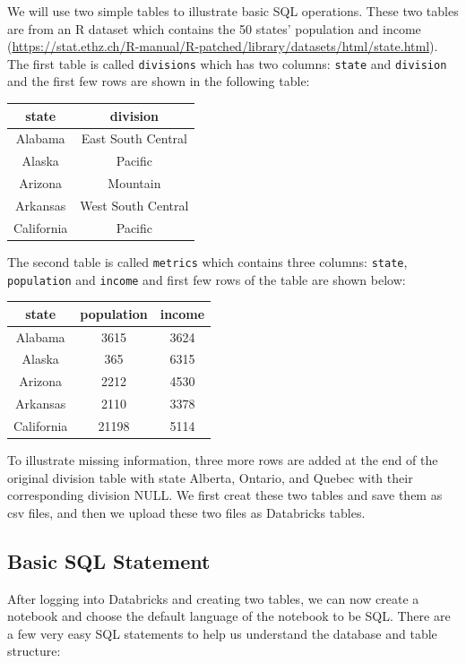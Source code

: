 \documentclass[
  12pt,
]{krantz}
\begin{document}
We will use two simple tables to illustrate basic SQL operations. These two tables are from an R dataset which contains the 50 states' population and income (\url{https://stat.ethz.ch/R-manual/R-patched/library/datasets/html/state.html}). The first table is called \texttt{divisions} which has two columns: \texttt{state} and \texttt{division} and the first few rows are shown in the following table:

\begin{longtable}[]{@{}cc@{}}
\toprule()
state & division \\
\midrule()
\endhead
Alabama & East South Central \\
Alaska & Pacific \\
Arizona & Mountain \\
Arkansas & West South Central \\
California & Pacific \\
\bottomrule()
\end{longtable}

The second table is called \texttt{metrics} which contains three columns: \texttt{state}, \texttt{population} and \texttt{income} and first few rows of the table are shown below:

\begin{longtable}[]{@{}ccc@{}}
\toprule()
state & population & income \\
\midrule()
\endhead
Alabama & 3615 & 3624 \\
Alaska & 365 & 6315 \\
Arizona & 2212 & 4530 \\
Arkansas & 2110 & 3378 \\
California & 21198 & 5114 \\
\bottomrule()
\end{longtable}

To illustrate missing information, three more rows are added at the end of the original division table with state Alberta, Ontario, and Quebec with their corresponding division NULL. We first creat these two tables and save them as csv files, and then we upload these two files as Databricks tables.

\hypertarget{basic-sql-statement}{%
\subsection{Basic SQL Statement}\label{basic-sql-statement}}

After logging into Databricks and creating two tables, we can now create a notebook and choose the default language of the notebook to be SQL. There are a few very easy SQL statements to help us understand the database and table structure:
\end{document}
